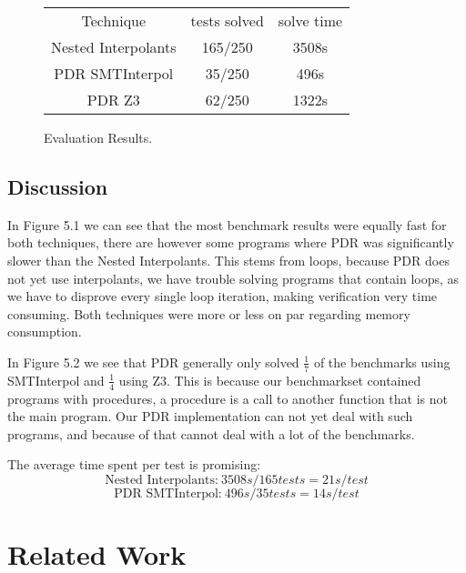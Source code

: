 \documentclass[11pt, a4paper, BCOR=10mm, ngerman]{scrbook}
\begin{document}
\vspace{2cm}

\begin{figure}[H]
\begin{center}
	\begin{tabu}{ccc}
		\cmidrule(lr){2-3}
		Technique & tests solved & solve time\\
		Nested Interpolants & 165/250 & 3508s \\
		PDR SMTInterpol& 35/250  & 496s \\
		PDR Z3 & 62/250& 1322s\\
		\bottomrule
	\end{tabu}
\end{center}
\caption{Evaluation Results.}
\end{figure}

\section{Discussion}
In Figure 5.1 we can see that the most benchmark results were equally fast for both techniques, there are however some programs where PDR was significantly slower than the Nested Interpolants. This stems from loops, because PDR does not yet use interpolants, we have trouble solving programs that contain loops, as we have to disprove every single loop iteration, making verification very time consuming. Both techniques were more or less on par regarding memory consumption. \par
In Figure 5.2 we see that PDR generally only solved $\frac{1}{7}$ of the benchmarks using SMTInterpol and $\frac{1}{4}$ using Z3. This is because our benchmarkset contained programs with procedures, a procedure is a call to another function that is not the main program. Our PDR implementation can not yet deal with such programs, and because of that cannot deal with a lot of the benchmarks. \par
The average time spent per test is promising: 
\begin{equation*}
\text{Nested Interpolants:}\ 3508s / 165tests = 21s/test
\end{equation*}
\begin{equation*}
\text{PDR SMTInterpol:}\ 496s / 35tests = 14s/test
\end{equation*}
\pagebreak


\chapter{Related Work}
\end{document}

